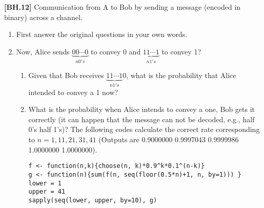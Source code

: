 \begin{exercise}
	\textbf{[BH.12]} Communication from A to Bob by sending a message (encoded in binary) across a channel.  
	\begin{enumerate}
		\item First answer the original questions in your own words.
		\item Now, Alice sends $\underbrace{00\cdots0}_{n 0's}$ to convey 0 and $\underbrace{11\cdots1}_{n 1's}$ to convey 1? 
		\begin{enumerate}
			\item 		Given that Bob receives $\underbrace{11\cdots1}_{n 1's}0$, what is the probability that Alice intended to convey a 1 now? 
			\item 
			What is the probability when Alice intends to convey a one, Bob gets it correctly (it can happen that the message can not be decoded, e.g., half 0's half 1's)? The following codes calculate the correct rate corresponding to $n=1,11,21,31,41$  (Outputs are 0.9000000 0.9997043 0.9999986 1.0000000 1.0000000).
			\begin{verbatim}
f <- function(n,k){choose(n, k)*0.9^k*0.1^(n-k)}
g <- function(n){sum(f(n, seq(floor(0.5*n)+1, n, by=1))) } 
lower = 1
upper = 41
sapply(seq(lower, upper, by=10), g)
			\end{verbatim} 
		\end{enumerate}
		
	\end{enumerate}  
\end{exercise}
